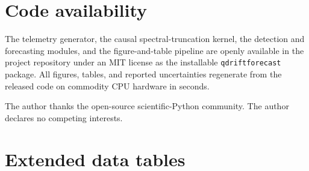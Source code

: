 \documentclass[
  aps,
  prresearch,
  reprint,
  amsmath,
  amssymb,
  nofootinbib,
  floatfix,
]{revtex4-2}
\begin{document}
\section*{Code availability}
The telemetry generator, the causal spectral-truncation kernel, the detection and
forecasting modules, and the figure-and-table pipeline are openly available in the
project repository under an MIT license as the installable \texttt{qdriftforecast}
package. All figures, tables, and reported uncertainties regenerate from the released
code on commodity CPU hardware in seconds.

\begin{acknowledgments}
The author thanks the open-source scientific-Python community. The author declares
no competing interests.
\end{acknowledgments}

\appendix

\section{Extended data tables}

\begin{table}[t]
  \centering
  \small
  \caption{\textbf{Detection ROC-AUC versus truncation order.} Mean~$\pm$~s.d.\
  over the $n=8$ randomized splits; best ROC-AUC over
  bottleneck ranks $k\in\{1,\dots,16\}$ per order). Detection is at chance at the
  commutative order $n{=}1$, peaks sharply at $n{=}2$ (in \textbf{bold}), and decays
  monotonically toward chance as the representation becomes over-complete --- the
  certified mechanism of Theorem~\ref{thm:optn} and the source data for
  Fig.~\ref{fig:detection}a.}
  \label{edtab:trunc}
  
\end{table}
\end{document}
